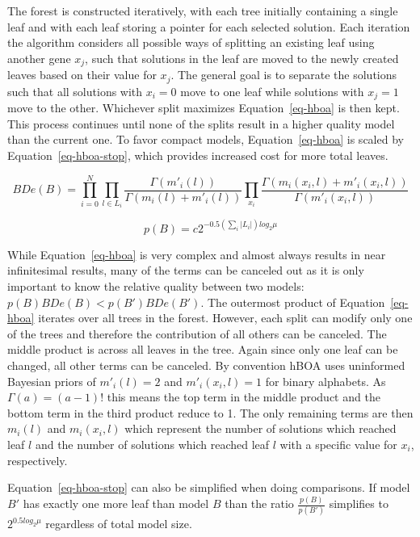\documentclass[twoside]{article}
\begin{document}
The forest is constructed iteratively, with each tree initially containing a single leaf
and with each leaf storing a pointer for each selected solution. Each iteration the algorithm considers
all possible ways of splitting an existing leaf using another gene $x_j$, such that solutions in the
leaf are moved to the newly created leaves based on their value for $x_j$. The general goal is to
separate the solutions such that all solutions with $x_i = 0$ move to one leaf while solutions with
$x_j = 1$ move to the other. Whichever split maximizes Equation~\ref{eq-hboa} is then kept.
This process continues until none of the splits result in a higher quality model than the current one. To favor compact
models, Equation~\ref{eq-hboa} is scaled by Equation~\ref{eq-hboa-stop}, which provides increased cost
for more total leaves.

\begin{equation}
  BDe(B) = \prod_{i=0}^{N}\prod_{l\in L_i} \frac{\Gamma(m'_i(l))}{\Gamma(m_i(l) + m'_i(l))}
  \prod_{x_i}\frac{\Gamma(m_i(x_i, l) + m'_i(x_i,l))}{\Gamma(m'_i(x_i,l))}
  \label{eq-hboa}
\end{equation}

\begin{equation}
  p(B) = c2^{-0.5(\sum_i|L_i|)log_2\mu}
  \label{eq-hboa-stop}
\end{equation}

While Equation~\ref{eq-hboa} is very complex and almost always results in near infinitesimal results, many
of the terms can be canceled out as it is only important to know the relative quality between two models:
$p(B)BDe(B) < p(B')BDe(B')$.
The outermost product of Equation~\ref{eq-hboa} iterates over all trees in the forest. However, each split
can modify only one of the trees and therefore the contribution of all others can be canceled. The middle
product is across all leaves in the tree. Again since only one leaf can be changed, all other terms can
be canceled. By convention hBOA uses uninformed Bayesian priors of $m'_i(l)= 2$ and $m'_i(x_i, l)=1$ for
binary alphabets. As $\Gamma(a) = (a-1)!$ this means the top term in the middle product and the bottom
term in the third product reduce to 1. The only remaining terms are then $m_i(l)$ and $m_i(x_i, l)$ which
represent the number of solutions which reached leaf $l$ and the number of solutions which reached leaf $l$
with a specific value for $x_i$, respectively.

Equation~\ref{eq-hboa-stop} can also be simplified when doing comparisons. If model $B'$ has exactly one more
leaf than model $B$ than the ratio $\frac{p(B)}{p(B')}$ simplifies to $2^{0.5 log_2\mu}$ regardless of
total model size.
\end{document}
